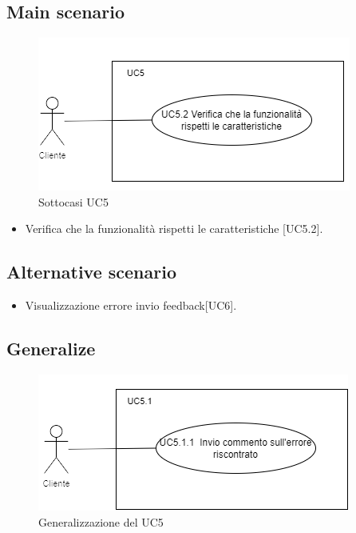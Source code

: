 \documentclass{article}
\begin{document}
    \subsection*{Main scenario}
        \begin{figure}[h]
            \centering
            \includegraphics{./imgUML/UC5-zoom.png}
            \caption{Sottocasi UC5}
            \label{fig:UC5_sottocasi}
        \end{figure}
        \begin{itemize}
            \item Verifica che la funzionalità rispetti le caratteristiche [UC5.2].
        \end{itemize}
        
    \subsection*{Alternative scenario}
    \begin{itemize}
        \item Visualizzazione errore invio feedback[UC6].
    \end{itemize}

    \subsection*{Generalize}
    \begin{figure}[h]
            \centering
            \includegraphics{./imgUML/UC5-zoom1.png}
            \caption{Generalizzazione del UC5}
            \label{fig:UC5_generalizzazione}
        \end{figure}
\end{document}

